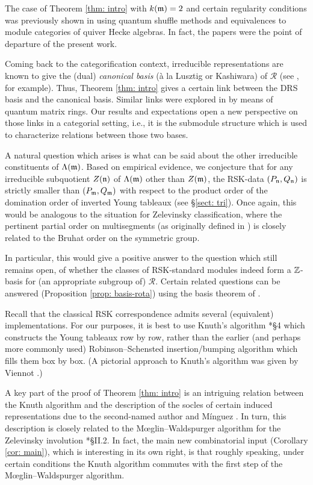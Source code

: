 \documentclass{ert-l} %
\begin{document}
The case of Theorem \ref{thm: intro} with $k(\mathfrak{m})=2$ and certain regularity conditions was previously shown in
\cite{1711.01721} using quantum shuffle methods and equivalences to module categories of quiver Hecke algebras.
In fact, the papers \cites{10.1093/imrn/rnz006, 1711.01721} were the point of departure of the present work.

Coming back to the categorification context, irreducible representations are known to give the (dual) \textit{canonical basis}
(\`{a} la Lusztig or Kashiwara) of $\mathcal{R}$ (see \cite{MR1985725}, for example).
Thus, Theorem \ref{thm: intro} gives a certain link between the DRS basis and the canonical basis.
Similar links were explored in \cite{MR1392496} by means of quantum matrix rings.
Our results and expectations open a new perspective on those links in a categorial setting, i.e., it is the submodule structure which is used to characterize relations between those two bases.

A natural question which arises is what can be said about the other irreducible constituents of $\Lambda(\mathfrak{m})$.
Based on empirical evidence, we conjecture that for any irreducible subquotient $Z(\mathfrak{n})$ of $\Lambda(\mathfrak{m})$ other than $Z(\mathfrak{m})$,
the RSK-data $(P_{\mathfrak{n}},Q_{\mathfrak{n}})$ is strictly smaller than $(P_{\mathfrak{m}},Q_{\mathfrak{m}})$ with respect to the product order of the domination order of inverted Young tableaux (see \S\ref{sect: tri}).
Once again, this would be analogous to the situation for Zelevinsky classification, where the pertinent partial order on multisegments (as originally defined in
\cite{MR584084}) is closely related to the Bruhat order on the symmetric group.

In particular, this would give a positive answer to the question which still remains open, of whether the classes of RSK-standard modules indeed form a $\mathbb{Z}$-basis for
(an appropriate subgroup of) $\mathcal{R}$. Certain related questions can be answered (Proposition \ref{prop: basis-rota}) using the basis theorem of \cite{MR0485944}.

Recall that the classical RSK correspondence admits several (equivalent) implementations.
For our purposes, it is best to use Knuth's algorithm \cite{MR0272654}*{\S4} which constructs the Young tableaux row by row,
rather than the earlier (and perhaps more commonly used) Robinson--Schensted insertion/bumping algorithm which fills them box by box.
(A pictorial approach to Knuth's algorithm was given by Viennot \cite{MR0470059}.)



A key part of the proof of Theorem \ref{thm: intro} is an intriguing relation between the Knuth algorithm and the
description of the socles of certain induced representations due to the second-named author and M\'inguez \cite{MR3573961}.
In turn, this description is closely related to the  M\oe glin--Waldspurger algorithm
for the Zelevinsky involution \cite{MR863522}*{\S II.2}.
In fact, the main new combinatorial input (Corollary \ref{cor: main}), which is interesting in its own right,
is that roughly speaking, under certain conditions the Knuth algorithm commutes with the first step of the M\oe glin--Waldspurger algorithm.
\end{document}
